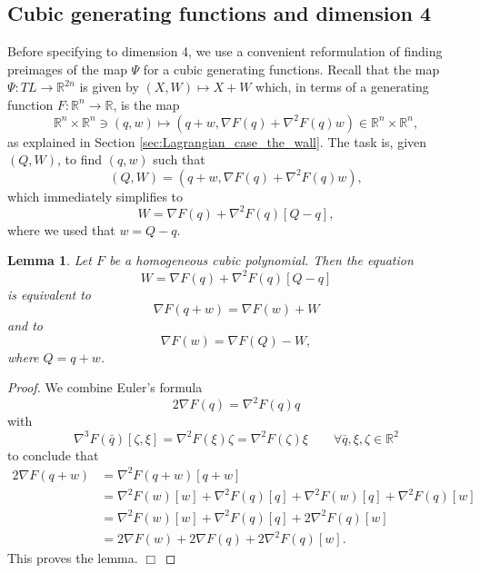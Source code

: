 \documentclass[12pt]{article}
\newtheorem{lemma}{Lemma}[section]
\newcommand{\proofend}{$\Box$\bigskip}
\newcommand{\R}{{\mathbb R}}
\begin{document}
\subsection{Cubic generating functions and dimension 4}

Before specifying to dimension 4, we use a convenient reformulation of finding preimages of the map $\Psi$ for a cubic generating functions. Recall that the map $\Psi:TL\to\R^{2n}$ is given by $(X,W)\mapsto X+W$ which, in terms of a generating function $F:\R^n\to\R$, is the map 
$$
\R^n\times\R^n\ni(q,w)\mapsto (q+w,\nabla F(q)+\nabla^2F(q)w)\in\R^n\times\R^n,
$$ 
as explained in Section \ref{sec:Lagrangian_case_the_wall}. The task is, given $(Q,W)$, to find $(q,w)$ such that
\begin{equation}\nonumber
(Q,W)=(q+w,\nabla F(q)+\nabla^2F(q)w),
\end{equation}
which immediately simplifies to
\begin{equation}\nonumber
W=\nabla F(q)+\nabla^2F(q)[Q-q],
\end{equation}
where we used that $w=Q-q$.

\begin{lemma}\label{lem:preimage_Psi_for_cubic_generating_function}
Let $F$ be a homogeneous cubic polynomial. Then the equation 
\begin{equation}\nonumber
W=\nabla F(q)+\nabla^2F(q)[Q-q]
\end{equation}
is equivalent to
\begin{equation}\nonumber
\nabla F(q+w)=\nabla F(w)+W
\end{equation}
 and to
\begin{equation}\nonumber
\nabla F(w)=\nabla F(Q)-W,
\end{equation}
where $Q=q+w$.
\end{lemma}

\begin{proof}
We combine Euler's formula
\begin{equation}\nonumber
2\nabla F(q)=\nabla^2F(q)q
\end{equation}
with 
\begin{equation}\nonumber
\nabla^3F(\bar q)[\zeta,\xi]=\nabla^2F(\xi)\zeta=\nabla^2F(\zeta)\xi \qquad\forall \bar q,\xi,\zeta\in\R^2
\end{equation}
to conclude that
\begin{equation}\nonumber
\begin{aligned}
2\nabla F(q+w)&=\nabla^2F(q+w)[q+w]\\
&=\nabla^2F(w)[w]+\nabla^2F(q)[q]+\nabla^2F(w)[q]+\nabla^2F(q)[w]\\
&=\nabla^2F(w)[w]+\nabla^2F(q)[q]+2\nabla^2F(q)[w]\\
&=2\nabla F(w)+2\nabla F(q)+2\nabla^2F(q)[w].
\end{aligned}
\end{equation}
This proves the lemma. \proofend
\end{proof}
\end{document}
